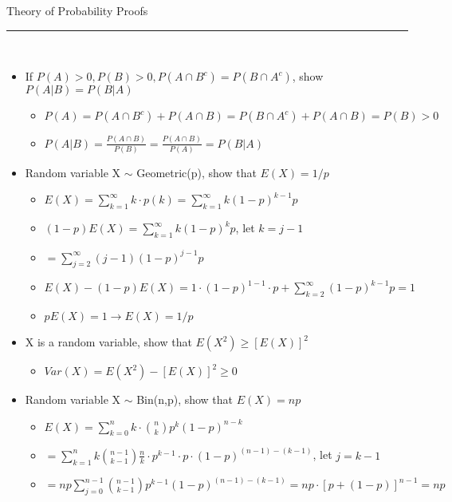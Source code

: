 \documentclass[10pt]{article}
\begin{document}
Theory of Probability Proofs \\
\rule{7.6in}{0.4pt}\\
\begin{itemize}
	\item If $P(A) > 0, P(B) > 0, P(A \cap B^c) = P(B \cap A^c)$, show $P(A|B) = P(B|A)$
		\begin{itemize}
			\item $P(A) = P(A \cap B^c) + P(A \cap B) = P(B \cap A^c) + P(A \cap B) = P(B) > 0$
			\item $P(A|B) = \frac{P(A \cap B)}{P(B)} = \frac{P(A \cap B)}{P(A)} = P(B|A)$ \\
		\end{itemize}
	\item Random variable X $\sim$ Geometric(p), show that $E(X) = 1/p$
		\begin{itemize}
			\item $E(X) = \sum\limits_{k=1}^\infty k\cdot p(k) = \sum\limits_{k=1}^\infty k(1-p)^{k-1}p$
			\item $(1-p)E(X) = \sum\limits_{k=1}^\infty k(1-p)^kp$, let $k = j-1$
			\item $= \sum\limits_{j=2}^\infty (j-1)(1-p)^{j-1}p$
			\item $E(X) - (1-p)E(X) = 1\cdot (1-p)^{1-1}\cdot p + \sum\limits_{k=2}^\infty (1-p)^{k-1}p = 1$
			\item $pE(X) = 1 \rightarrow E(X) = 1/p$ \\
		\end{itemize}
	\item X is a random variable, show that $E(X^2) \geq [E(X)]^2$
		\begin{itemize}
			\item $Var(X) = E(X^2) - [E(X)]^2 \geq 0$ \\
		\end{itemize}
	\item Random variable X $\sim$ Bin(n,p), show that $E(X) = np$ 
		\begin{itemize}
			\item $E(X) = \sum\limits_{k=0}^n k\cdot {n \choose k}p^k(1-p)^{n-k} $
			\item $= \sum\limits_{k=1}^n k{n-1 \choose k-1}\frac{n}{k} \cdot p^{k-1} \cdot p \cdot (1-p)^{(n-1) - (k-1)}$, let $j = k-1$
			\item $= np\sum\limits_{j=0}^{n-1} {n-1 \choose k-1}p^{k-1} (1-p)^{(n-1)-(k-1)} = np\cdot [p+(1-p)]^{n-1} = np$ \\
		\end{itemize}

\end{itemize}
\end{document}
